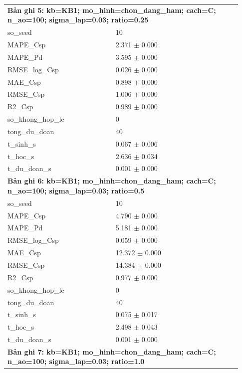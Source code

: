 \begin{longtable}{p{0.43\linewidth}p{0.50\linewidth}}
\midrule
\multicolumn{2}{p{0.95\linewidth}}{\textbf{Bản ghi 5: kb=KB1; mo\_hinh=chon\_dang\_ham; cach=C; n\_ao=100; sigma\_lap=0.03; ratio=0.25}} \\
so\_\allowbreak seed & 10 \\
MAPE\_\allowbreak Csp & 2.371 $\pm$ 0.000 \\
MAPE\_\allowbreak Pd & 3.595 $\pm$ 0.000 \\
RMSE\_\allowbreak log\_\allowbreak Csp & 0.026 $\pm$ 0.000 \\
MAE\_\allowbreak Csp & 0.898 $\pm$ 0.000 \\
RMSE\_\allowbreak Csp & 1.006 $\pm$ 0.000 \\
R2\_\allowbreak Csp & 0.989 $\pm$ 0.000 \\
so\_\allowbreak khong\_\allowbreak hop\_\allowbreak le & 0 \\
tong\_\allowbreak du\_\allowbreak doan & 40 \\
t\_\allowbreak sinh\_\allowbreak s & 0.067 $\pm$ 0.006 \\
t\_\allowbreak hoc\_\allowbreak s & 2.636 $\pm$ 0.034 \\
t\_\allowbreak du\_\allowbreak doan\_\allowbreak s & 0.001 $\pm$ 0.000 \\
\midrule
\multicolumn{2}{p{0.95\linewidth}}{\textbf{Bản ghi 6: kb=KB1; mo\_hinh=chon\_dang\_ham; cach=C; n\_ao=100; sigma\_lap=0.03; ratio=0.5}} \\
so\_\allowbreak seed & 10 \\
MAPE\_\allowbreak Csp & 4.790 $\pm$ 0.000 \\
MAPE\_\allowbreak Pd & 5.181 $\pm$ 0.000 \\
RMSE\_\allowbreak log\_\allowbreak Csp & 0.059 $\pm$ 0.000 \\
MAE\_\allowbreak Csp & 12.372 $\pm$ 0.000 \\
RMSE\_\allowbreak Csp & 14.384 $\pm$ 0.000 \\
R2\_\allowbreak Csp & 0.977 $\pm$ 0.000 \\
so\_\allowbreak khong\_\allowbreak hop\_\allowbreak le & 0 \\
tong\_\allowbreak du\_\allowbreak doan & 40 \\
t\_\allowbreak sinh\_\allowbreak s & 0.075 $\pm$ 0.017 \\
t\_\allowbreak hoc\_\allowbreak s & 2.498 $\pm$ 0.043 \\
t\_\allowbreak du\_\allowbreak doan\_\allowbreak s & 0.001 $\pm$ 0.000 \\
\midrule
\multicolumn{2}{p{0.95\linewidth}}{\textbf{Bản ghi 7: kb=KB1; mo\_hinh=chon\_dang\_ham; cach=C; n\_ao=100; sigma\_lap=0.03; ratio=1.0}} \\

\end{longtable}

